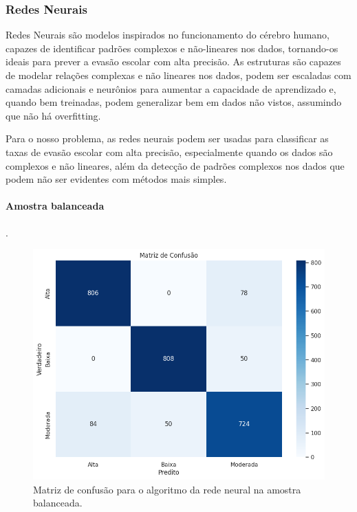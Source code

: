 \subsubsection{Redes Neurais}

\par Redes Neurais são modelos inspirados no funcionamento do cérebro humano, capazes de identificar padrões complexos e não-lineares nos dados, tornando-os ideais para prever a evasão escolar com alta precisão. As estruturas são capazes de modelar relações complexas e não lineares nos dados, podem ser escaladas com camadas adicionais e neurônios para aumentar a capacidade de aprendizado e, quando bem treinadas, podem generalizar bem em dados não vistos, assumindo que não há overfitting.

\par Para o nosso problema, as redes neurais podem ser usadas para classificar as taxas de evasão escolar com alta precisão, especialmente quando os dados são complexos e não lineares, além da detecção de padrões complexos nos dados que podem não ser evidentes com métodos mais simples.

\paragraph{Amostra balanceada}.

\begin{figure}[H]
    \centering
    \includegraphics[scale = 0.4]{Graphics/Mat-Conf-Rede-Bal.png}
    \caption{Matriz de confusão para o algoritmo da rede neural na amostra balanceada.}
    \label{fig:enter-label}
\end{figure}

